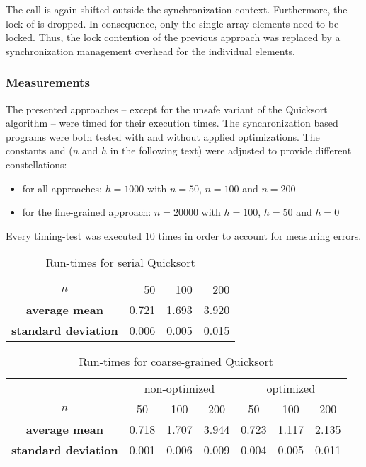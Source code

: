 The call  is again shifted outside the synchronization context. Furthermore, the lock of  is dropped. In consequence, only the single array elements need to be locked. Thus, the lock contention of the previous approach was replaced by a synchronization management overhead for the individual elements.

\subsubsection{Measurements}
The presented approaches -- except for the unsafe variant of the Quicksort algorithm -- were timed for their execution times. The synchronization based programs were both tested with and without applied optimizations. The constants  and  ($n$ and $h$ in the following text) were adjusted to provide different constellations:
\begin{itemize}
\item for all approaches: $h = 1000$ with $n = 50$, $n = 100$ and $n = 200$
\item for the fine-grained approach: $n = 20000$ with $h = 100$, $h = 50$ and $h = 0$
\end{itemize}
Every timing-test was executed 10 times in order to account for measuring errors.

\begin{table}[h!]
\begin{center}
\begin{tabular}{ c| r|r|r|}
\cline{2-4} $n$ & 50 & 100 & 200 \\ 
\cline{2-4} \textbf{average mean} & 0.721 & 1.693 & 3.920 \\ 
\cline{2-4} \textbf{standard deviation} & 0.006 & 0.005 & 0.015 \\ 
\cline{2-4}
\end{tabular} 
\caption{Run-times for serial Quicksort}
\label{table:serial_quicksort}
\end{center}
\end{table}


\begin{table}[h!]
\begin{center}
\begin{tabular}{c |c|c|c||c|c|c|}
  \multicolumn{1}{c}{} & \multicolumn{3}{c}{non-optimized} & \multicolumn{3}{c}{optimized}\\ \cline{2-7}
  $n$ & 50 & 100 & 200 & 50 & 100 & 200\\ \cline{2-7}
  \textbf{average mean} & 0.718 & 1.707 & 3.944 & 0.723 & 1.117 & 2.135	\\ \cline{2-7}
  \textbf{standard deviation} & 0.001 & 0.006 & 0.009 & 0.004 & 0.005 & 0.011\\ \cline{2-7}
\end{tabular}
\caption{Run-times for coarse-grained Quicksort}
\label{table:coarse_quicksort}
\end{center}
\end{table}

